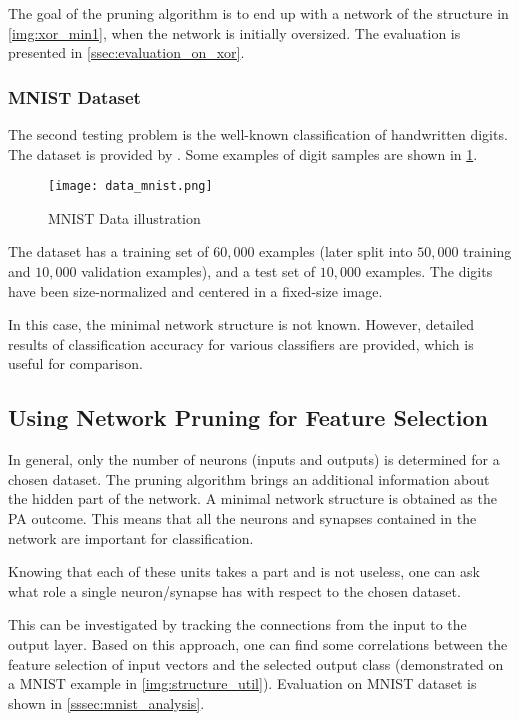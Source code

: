 The goal of the pruning algorithm is to end up with a network of the structure in \cref{img:xor_min1}, when the network is initially oversized. The evaluation is presented in \cref{ssec:evaluation_on_xor}.

\subsubsection*{MNIST Dataset}
The second testing problem is the well-known classification of handwritten digits. The dataset is provided by \citep{online:mnist}. Some examples of digit samples are shown in \cref{img:data_mnist}.

\begin{figure}[H]
  \centering
  \texttt{[image: data\_mnist.png]}
  \caption{MNIST Data illustration \citep{online:mnist}}
  \label{img:data_mnist}
\end{figure}

The dataset has a training set of $ 60,000 $ examples (later split into $ 50,000 $ training and $ 10,000 $ validation examples), and a test set of $ 10,000 $ examples. The digits have been size-normalized and centered in a fixed-size image.

In this case, the minimal network structure is not known. However, detailed results of classification accuracy for various classifiers are provided, which is useful for comparison.

\subsection{Using Network Pruning for Feature Selection} \label{ssec:minimal_structure_util}
In general, only the number of neurons (inputs and outputs) is determined for a chosen dataset. The pruning algorithm brings an additional information about the hidden part of the network. A minimal network structure is obtained as the PA outcome. This means that all the neurons and synapses contained in the network are important for classification.

Knowing that each of these units takes a part and is not useless, one can ask what role a single neuron/synapse has with respect to the chosen dataset.

This can be investigated by tracking the connections from the input to the output layer. Based on this approach, one can find some correlations between the feature selection of input vectors and the selected output class (demonstrated on a MNIST example in \cref{img:structure_util}). Evaluation on MNIST dataset is shown in \cref{sssec:mnist_analysis}.

